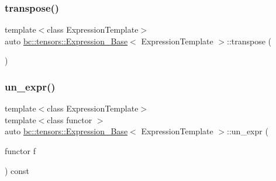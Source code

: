 \subsubsection{\texorpdfstring{transpose()}{transpose()}\hspace{0.1cm}{\footnotesize\ttfamily [2/2]}}
{\footnotesize\ttfamily template$<$class Expression\+Template$>$ \\
auto \hyperlink{classbc_1_1tensors_1_1Expression__Base}{bc\+::tensors\+::\+Expression\+\_\+\+Base}$<$ Expression\+Template $>$\+::transpose (\begin{DoxyParamCaption}{ }\end{DoxyParamCaption})\hspace{0.3cm}{\ttfamily [inline]}}

\mbox{\label{classbc_1_1tensors_1_1Expression__Base_aa4f92403ae1d1586280abb0b19da73db}} 
\subsubsection{\texorpdfstring{un\+\_\+expr()}{un\_expr()}}
{\footnotesize\ttfamily template$<$class Expression\+Template$>$ \\
template$<$class functor $>$ \\
auto \hyperlink{classbc_1_1tensors_1_1Expression__Base}{bc\+::tensors\+::\+Expression\+\_\+\+Base}$<$ Expression\+Template $>$\+::un\+\_\+expr (\begin{DoxyParamCaption}\item[{functor}]{f }\end{DoxyParamCaption}) const\hspace{0.3cm}{\ttfamily [inline]}}

\mbox{\label{classbc_1_1tensors_1_1Expression__Base_a08bd44d9139a11ecab3935267b6557ec}} 
